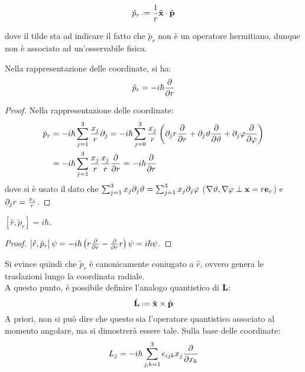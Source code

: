 \begin{equation}
	\tilde{p}_r \defeq \frac{1}{r} \hat{\ve{x}}\cdot\hat{\ve{p}}
	\label{eq:29}
\end{equation}

dove il tilde sta ad indicare il fatto che $ \tilde{p}_r $ non è un operatore hermitiano, dunque non è associato ad un'osservabile fisica.

\begin{proposition}
	Nella rappresentazione delle coordinate, si ha:
	\begin{equation}
		\tilde{p}_r = - i \hbar \frac{\partial}{\partial r}
		\label{eq:30}
	\end{equation}
\end{proposition}
\begin{proof}
	Nella rappresentazione delle coordinate:
	\begin{equation*}
		\begin{split}
			\tilde{p}_r &= -i\hbar \sum_{j = 1}^{3} \frac{x_j}{r} \partial_j = -i\hbar \sum_{j = 0}^{3} \frac{x_j}{r} \left(\partial_j r \frac{\partial}{\partial r} + \partial_j \vartheta \frac{\partial}{\partial \vartheta} + \partial_j \varphi \frac{\partial}{\partial \varphi}\right)\\
				    &= -i\hbar \sum_{j = 1}^{3} \frac{x_j}{r} \frac{x_j}{r} \frac{\partial}{\partial r} = -i\hbar \frac{\partial}{\partial r}
		\end{split}
	\end{equation*}
	dove si è usato il dato che $ \sum_{j = 1}^{3} x_j \partial_j \vartheta = \sum_{j = 1}^{3} x_j \partial_j \varphi $ ($ \nabla\vartheta, \nabla\varphi \perp \mathbf{x} = r\mathbf{e}_r $) e $ \partial_j r = \frac{x_j}{r} $.
\end{proof}

\begin{proposition}
	$ \left[\hat{r}, \tilde{p}_r\right] = i\hbar $.
\end{proposition}
\begin{proof}
	$ \left[\hat{r}, \tilde{p}_r\right]\psi = -i\hbar \left(r \frac{\partial}{\partial r} - \frac{\partial}{\partial r}r\right)\psi = i\hbar\psi $.
\end{proof}

Si evince quindi che $ \tilde{p}_r $ è canonicamente coniugato a $ \hat{r} $, ovvero genera le traslazioni lungo la coordinata radiale.\\
A questo punto, è possibile definire l'analogo quantistico di $ \mathbf{L} $:
\begin{equation}
	\hat{\ve{L}} \defeq \hat{\ve{x}}\times\hat{\ve{p}}
	\label{eq:1.31}
\end{equation}
A priori, non si può dire che questo sia l'operatore quantistico associato al momento angolare, ma si dimostrerà essere tale. Sulla base delle coordinate:
\begin{equation}
	L_j = -i\hbar \sum_{j,k = 1}^{3} \epsilon_{ijk} x_j \frac{\partial}{\partial x_k}
	\label{eq:1.32}
\end{equation}

